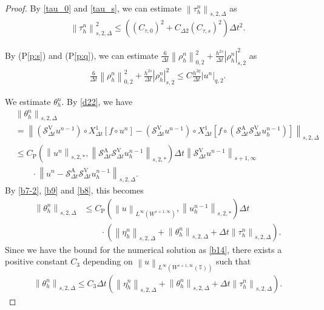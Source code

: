 \documentclass[10pt,a4paper,tbtags,leqno]{amsart}
\theoremstyle{definition}
\numberwithin{equation}{section}
\def\norm#1#2{\left\|#2\right\|_{#1}}
\def\snorm#1#2{\left|#2\right|_{#1}}
\begin{document}
\begin{proof}
  By \eqref{tau_0} and \eqref{tau_s}, we can estimate $ \norm{s, 2, \Delta}{\tau_h^n} $ as 
  \begin{align} 
    \norm{s, 2, \Delta}{\tau_h^n}^2 \leq \left((C_{\tau,0})^2 + C_{\Delta 2} (C_{\tau,s})^2\right)\Delta t^2. \label{b32} 
  \end{align} 

  By (P\ref{p:s}) and (P\ref{p:q}), we can estimate $ \frac{6}{\Delta t} \norm{0, 2}{\rho_h^n}^2 + \frac{h^{2s}}{\Delta t} \snorm{s, 2}{\rho_h^n}^2 $ as 
  \begin{align} 
    \frac{6}{\Delta t} \norm{0, 2}{\rho_h^n}^2 + \frac{h^{2s}}{\Delta t} \snorm{s, 2}{\rho_h^n}^2 \leq C \frac{h^{2q}}{\Delta t} \snorm{q,2}{u^n}. \label{b33}
  \end{align}

  We estimate $ \theta_h^n $. By \eqref{d22}, we have 
  \begin{align} 
    & \norm{s, 2, \Delta}{\theta_h^n} \\
    & = \norm{s, 2, \Delta}{(\mathcal{S}_{\Delta t}^{\mathrm{V}} u^{n - 1}) \circ {X_{\Delta t}^1}[f \circ u^n] - (\mathcal{S}_{\Delta t}^{\mathrm{V}} u^{n - 1}) \circ {X_{\Delta t}^1}[f \circ (\mathcal{S}_{\Delta t}^{\mathrm{A}} \mathcal{S}_{\Delta t}^{\mathrm{V}} u_h^{n - 1})]} \\
    & \leq C_{\mathrm{P}} (\norm{s, 2, \ast}{u^n}, \norm{s, 2, \ast}{\mathcal{S}_{\Delta t}^{\mathrm{A}} \mathcal{S}_{\Delta t}^{\mathrm{V}} u_h^{n - 1}}) \Delta t \norm{s + 1, \infty}{\mathcal{S}_{\Delta t}^{\mathrm{V}} u^{n - 1}} \\ & \qquad \cdot \norm{s, 2, \Delta}{u^n - \mathcal{S}_{\Delta t}^{\mathrm{A}} \mathcal{S}_{\Delta t}^{\mathrm{V}} u_h^{n - 1}}. 
  \end{align}
  By \eqref{b7-2}, \eqref{b9} and \eqref{b8}, this becomes 
  \begin{align} 
    \norm{s, 2, \Delta}{\theta_h^n} & \leq C_{\mathrm{P}} (\norm{L^\infty(W^{s+1, \infty})}{u}, \norm{s, 2, \ast}{u_h^{n - 1}}) \Delta t \\ & \qquad \cdot (\norm{s, 2, \Delta}{\eta_h^n} + \norm{s, 2, \Delta}{\theta_h^n} + \Delta t \norm{s, 2, \Delta}{\tau_h^n}). 
  \end{align} 
  Since we have the bound for the numerical solution as \eqref{b14}, there exists a positive constant $ C_{3} $ depending on $ \norm{L^\infty(W^{s+1, \infty}(\mathbb{T}))}{u} $ such that 
  \begin{align}
    \norm{s, 2, \Delta}{\theta_h^n} \leq C_{3} \Delta t (\norm{s, 2, \Delta}{\eta_h^n} + \norm{s, 2, \Delta}{\theta_h^n} + \Delta t \norm{s, 2, \Delta}{\tau_h^n}). 

\end{align}
\end{proof}
\end{document}
